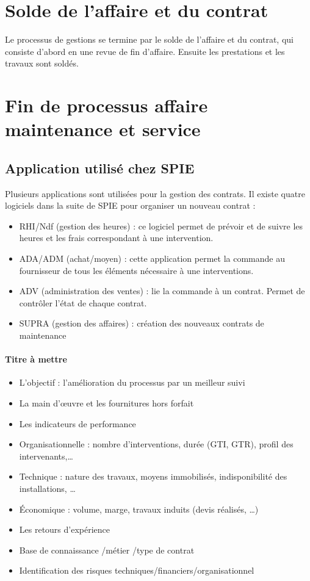 \section{Solde de l’affaire et du contrat}

Le processus de gestions se termine par le solde de l’affaire et du contrat, qui consiste d’abord en une revue de fin d’affaire. Ensuite les prestations et les travaux sont soldés.

\section{Fin de processus affaire maintenance et service}

\subsection{Application utilisé chez SPIE}

Plusieurs applications sont utilisées pour la gestion des contrats. Il existe quatre logiciels dans la suite de SPIE pour organiser un nouveau contrat :

\begin{itemize}
\item RHI/Ndf (gestion des heures) : ce logiciel permet de prévoir et de suivre les heures et les frais correspondant à une intervention.
\item ADA/ADM (achat/moyen) : cette application permet la commande au fournisseur de tous les éléments nécessaire à une interventions.
\item ADV (administration des ventes) : lie la commande à un contrat. Permet de contrôler l’état de chaque contrat.
\item SUPRA (gestion des affaires) : création des nouveaux contrats de maintenance
\end{itemize}

\paragraph{Titre à mettre}

\begin{itemize}
\item L’objectif : l’amélioration du processus par un meilleur suivi
\item La main d’œuvre et les fournitures hors forfait
\item Les indicateurs de performance 
\item Organisationnelle : nombre d’interventions, durée (GTI, GTR), profil des intervenants,…
\item Technique : nature des travaux, moyens immobilisés, indisponibilité des installations,  …
\item Économique : volume, marge, travaux induits (devis réalisés, …)
\item Les retours d’expérience
\item Base de connaissance /métier /type de contrat
\item Identification des risques techniques/financiers/organisationnel
\end{itemize}

